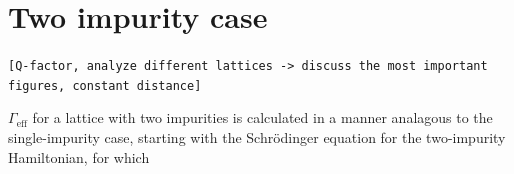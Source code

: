 \documentclass[aps,pra,superscriptaddress,twocolumn]{revtex4-1}
\newcommand{\commentSO}[1]{\texttt{\color{orange}[#1]}}
\begin{document}




\section{Two impurity case}
\commentSO{Q-factor, analyze different lattices -> discuss the most important figures, constant distance}

$\Gamma_\text{eff}$ for a lattice with two impurities is calculated in a manner analagous to the single-impurity case, starting with the Schr\"odinger equation for the two-impurity Hamiltonian, for which 
\end{document}
